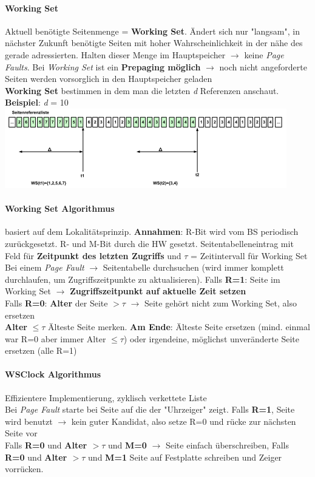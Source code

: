 \documentclass[11pt,a4paper,landscape]{article}
\begin{document}
\begin{multicols*}{3}
	\paragraph{Working Set} Aktuell benötigte Seitenmenge = \textbf{Working Set}. Ändert sich nur "langsam", in nächster Zukunft benötigte Seiten mit hoher Wahrscheinlichkeit in der nähe des gerade adressierten. Halten dieser Menge im Hauptspeicher $\rightarrow$ keine \textit{Page Faults}. Bei \textit{Working Set} ist ein \textbf{Prepaging möglich} $\rightarrow$ noch nicht angeforderte Seiten werden vorsorglich in den Hauptspeicher geladen\\
	\textbf{Working Set} bestimmen in dem man die letzten \textit{d} Referenzen anschaut. \textbf{Beispiel}: \textit{d} = 10\\
	\includegraphics[width=1\columnwidth]{workingSet}
	\paragraph{Working Set Algorithmus} basiert auf dem Lokalitätsprinzip. \textbf{Annahmen}: R-Bit wird vom BS periodisch zurückgesetzt. R- und M-Bit durch die HW gesetzt. Seitentabelleneintrag mit Feld für \textbf{Zeitpunkt des letzten Zugriffs} und $\tau$ = Zeitintervall für Working Set\\ Bei einem \textit{Page Fault} $\rightarrow$ Seitentabelle durchsuchen (wird immer komplett durchlaufen, um Zugriffszeitpunkte zu aktualisieren). Falls \textbf{R=1}: Seite im Working Set $\rightarrow$ \textbf{Zugriffszeitpunkt auf aktuelle Zeit setzen}\\ Falls \textbf{R=0}: \textbf{Alter} der Seite $> \tau$ $\rightarrow$ Seite gehört nicht zum Working Set, also ersetzen\\ \textbf{Alter} $\leq \tau$ Älteste Seite merken. \textbf{Am Ende}: Älteste Seite ersetzen (mind. einmal war R=0 aber immer Alter $\leq \tau$) oder irgendeine, möglichst unveränderte Seite ersetzen (alle R=1)
	\paragraph{WSClock Algorithmus} Effizientere Implementierung, zyklisch verkettete Liste\\
	Bei \textit{Page Fault} starte bei Seite auf die der "Uhrzeiger" zeigt. Falls \textbf{R=1}, Seite wird benutzt $\rightarrow$ kein guter Kandidat, also setze R=0 und rücke zur nächsten Seite vor \\
	Falls \textbf{R=0} und \textbf{Alter $>\tau$} und \textbf{M=0} $\rightarrow$ Seite einfach überschreiben, Falls \textbf{R=0} und \textbf{Alter $>\tau$} und \textbf{M=1} Seite auf Festplatte schreiben und Zeiger vorrücken.

\end{multicols*}
\end{document}
